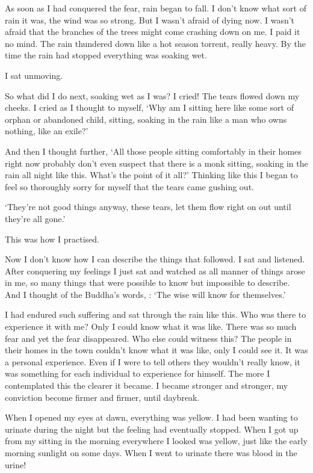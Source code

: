 As soon as I had conquered the fear, rain began to fall. I don't know what sort of rain it was, the wind was so strong. But I wasn't afraid of dying now. I wasn't afraid that the branches of the trees might come crashing down on me. I paid it no mind. The rain thundered down like a hot season torrent, really heavy. By the time the rain had stopped everything was soaking wet. 

I sat unmoving. 

So what did I do next, soaking wet as I was? I cried! The tears flowed down my cheeks. I cried as I thought to myself, `Why am I sitting here like some sort of orphan or abandoned child, sitting, soaking in the rain like a man who owns nothing, like an exile?' 

And then I thought further, `All those people sitting comfortably in their homes right now probably don't even suspect that there is a monk sitting, soaking in the rain all night like this. What's the point of it all?' Thinking like this I began to feel so thoroughly sorry for myself that the tears came gushing out. 

`They're not good things anyway, these tears, let them flow right on out until they're all gone.' 

This was how I practised. 

Now I don't know how I can describe the things that followed. I sat and listened. After conquering my feelings I just sat and watched as all manner of things arose in me, so many things that were possible to know but impossible to describe. And I thought of the Buddha's words, : `The wise will know for themselves.' 

I had endured such suffering and sat through the rain like this. Who was there to experience it with me? Only I could know what it was like. There was so much fear and yet the fear disappeared. Who else could witness this? The people in their homes in the town couldn't know what it was like, only I could see it. It was a personal experience. Even if I were to tell others they wouldn't really know, it was something for each individual to experience for himself. The more I contemplated this the clearer it became. I became stronger and stronger, my conviction become firmer and firmer, until daybreak. 

When I opened my eyes at dawn, everything was yellow. I had been wanting to urinate during the night but the feeling had eventually stopped. When I got up from my sitting in the morning everywhere I looked was yellow, just like the early morning sunlight on some days. When I went to urinate there was blood in the urine! 

